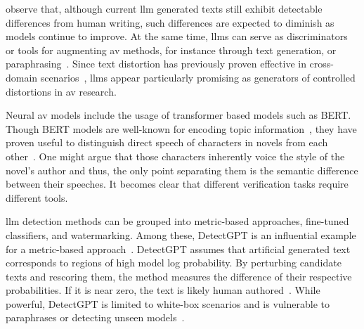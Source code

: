 \citet{llm_detection_av_2025} observe that, although current \ac{llm} generated texts still exhibit detectable differences from human writing, such differences are expected to diminish as models continue to improve.
At the same time, \acp{llm} can serve as discriminators~\citep{futrzynski_pairwise_2021} or tools for augmenting \ac{av} methods, for instance through text generation, or paraphrasing~\citep{mao_raidar_2024,baradia_mirror_2025}.
Since text distortion has previously proven effective in cross-domain scenarios~\citep{bischoff_importance_2020}, \acp{llm} appear particularly promising as generators of controlled distortions in \ac{av} research.

Neural \ac{av} models include the usage of transformer based models such as BERT.
Though BERT models are well-known for encoding topic information~\citep{sawatphol_cross_topic_av_24}, they have proven useful to distinguish direct speech of characters in novels from each other~\citep{michel_fictional_2024}.
One might argue that those characters inherently voice the style of the novel's author and thus, the only point separating them is the semantic difference between their speeches.
It becomes clear that different verification tasks require different tools.

\Ac{llm} detection methods can be grouped into metric-based approaches, fine-tuned classifiers, and watermarking. 
Among these, DetectGPT is an influential example for a metric-based approach~\citep{wang_stumbling_2024}.
DetectGPT assumes that artificial generated text corresponds to regions of high model log probability. 
By perturbing candidate texts and rescoring them, the method measures the difference of their respective probabilities.
If it is near zero, the text is likely human authored~\citep{mitchell_detectgpt_2023}. 
While powerful, DetectGPT is limited to white-box scenarios %
and is vulnerable to paraphrases or detecting unseen models~\citep{Wu_ODD_challenges_2025}.

